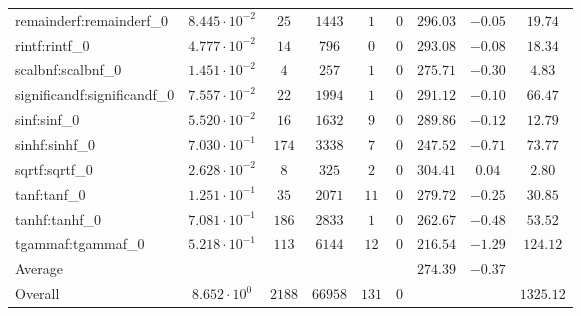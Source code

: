\begin{tabular}{|l|c|c|c|c|c|c|c|c|}
remainderf:remainderf\_0     & $ 8.445 \cdot 10^{-2} $ & $ 25     $ & $ 1443  $ & $ 1   $ & $ 0   $ & $ 296.03      $ & $ -0.05   $ & $ 19.74   $ \\
rintf:rintf\_0               & $ 4.777 \cdot 10^{-2} $ & $ 14     $ & $ 796   $ & $ 0   $ & $ 0   $ & $ 293.08      $ & $ -0.08   $ & $ 18.34   $ \\
scalbnf:scalbnf\_0           & $ 1.451 \cdot 10^{-2} $ & $ 4      $ & $ 257   $ & $ 1   $ & $ 0   $ & $ 275.71      $ & $ -0.30   $ & $ 4.83    $ \\
significandf:significandf\_0 & $ 7.557 \cdot 10^{-2} $ & $ 22     $ & $ 1994  $ & $ 1   $ & $ 0   $ & $ 291.12      $ & $ -0.10   $ & $ 66.47   $ \\
sinf:sinf\_0                 & $ 5.520 \cdot 10^{-2} $ & $ 16     $ & $ 1632  $ & $ 9   $ & $ 0   $ & $ 289.86      $ & $ -0.12   $ & $ 12.79   $ \\
sinhf:sinhf\_0               & $ 7.030 \cdot 10^{-1} $ & $ 174    $ & $ 3338  $ & $ 7   $ & $ 0   $ & $ 247.52      $ & $ -0.71   $ & $ 73.77   $ \\
sqrtf:sqrtf\_0               & $ 2.628 \cdot 10^{-2} $ & $ 8      $ & $ 325   $ & $ 2   $ & $ 0   $ & $ 304.41      $ & $ 0.04    $ & $ 2.80    $ \\
tanf:tanf\_0                 & $ 1.251 \cdot 10^{-1} $ & $ 35     $ & $ 2071  $ & $ 11  $ & $ 0   $ & $ 279.72      $ & $ -0.25   $ & $ 30.85   $ \\
tanhf:tanhf\_0               & $ 7.081 \cdot 10^{-1} $ & $ 186    $ & $ 2833  $ & $ 1   $ & $ 0   $ & $ 262.67      $ & $ -0.48   $ & $ 53.52   $ \\
tgammaf:tgammaf\_0           & $ 5.218 \cdot 10^{-1} $ & $ 113    $ & $ 6144  $ & $ 12  $ & $ 0   $ & $ 216.54      $ & $ -1.29   $ & $ 124.12  $ \\
\hline
Average                      & $                     $ & $        $ & $       $ & $     $ & $     $ & $ 274.39      $ & $ -0.37   $ & $         $ \\
\hline
Overall                      & $ 8.652 \cdot 10^{0}  $ & $ 2188   $ & $ 66958 $ & $ 131 $ & $ 0   $ & $             $ & $         $ & $ 1325.12 $ \\
\hline
\end{tabular}
